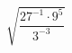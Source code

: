 \begin{ex}[type=calculate]
	\begin{condition}
		\( \sqrt{\dfrac{27^{-1}\cdot9^5}{3^{-3}}} \)
	\end{condition}
\end{ex}